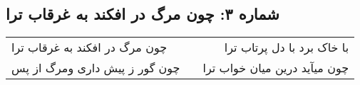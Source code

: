 \begin{center}
\section*{شماره ۳: چون مرگ در افکند به غرقاب ترا}
\label{sec:003}
\begin{longtable}{l p{0.5cm} r}
چون مرگ در افکند به غرقاب ترا
&&
با خاک برد با دل پرتاب ترا
\\
چون گور ز پیش داری ومرگ از پس
&&
چون میآید درین میان خواب ترا
\\
\end{longtable}
\end{center}
